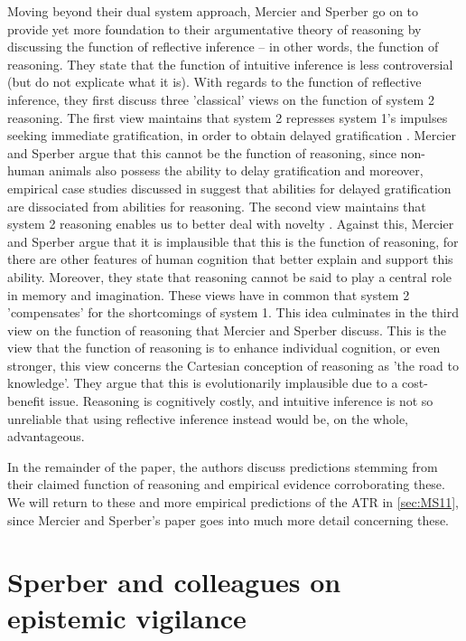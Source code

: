 Moving beyond their dual system approach, Mercier and Sperber go on to provide yet more foundation to their argumentative theory of reasoning by discussing the function of reflective inference -- in other words, the function of reasoning.
They state that the function of intuitive inference is less controversial (but do not explicate what it is).
With regards to the function of reflective inference, they first discuss three 'classical' views on the function of system 2 reasoning.
The first view maintains that system 2 represses system 1's impulses seeking immediate gratification, in order to obtain delayed gratification \citep{Sloman96}. Mercier and Sperber argue that this cannot be the function of reasoning, since non-human animals also possess the ability to delay gratification and moreover, empirical case studies discussed in \citet{Damasio94} suggest that abilities for delayed gratification are dissociated from abilities for reasoning.
The second view maintains that system 2 reasoning enables us to better deal with novelty \citep{EvansOver1996}. Against this, Mercier and Sperber argue that it is implausible that this is the function of reasoning, for there are other features of human cognition that better explain and support this ability. Moreover, they state that reasoning cannot be said to play a central role in memory and imagination.
These views have in common that system 2 'compensates' for the shortcomings of system 1.
This idea culminates in the third view on the function of reasoning that Mercier and Sperber discuss. This is the view that the function of reasoning is to enhance individual cognition, or even stronger, this view concerns the Cartesian conception of reasoning as 'the road to knowledge'.
They argue that this is evolutionarily implausible due to a cost-benefit issue.
Reasoning is cognitively costly, and intuitive inference is not so unreliable that using reflective inference instead would be, on the whole, advantageous.

In the remainder of the paper, the authors discuss predictions stemming from their claimed function of reasoning and empirical evidence corroborating these. We will return to these and more empirical predictions of the ATR in \cref{sec:MS11}, since Mercier and Sperber's \citeyear{MS11} paper goes into much more detail concerning these.

\section{Sperber and colleagues on epistemic vigilance}
\label{sec:Sperber10}

